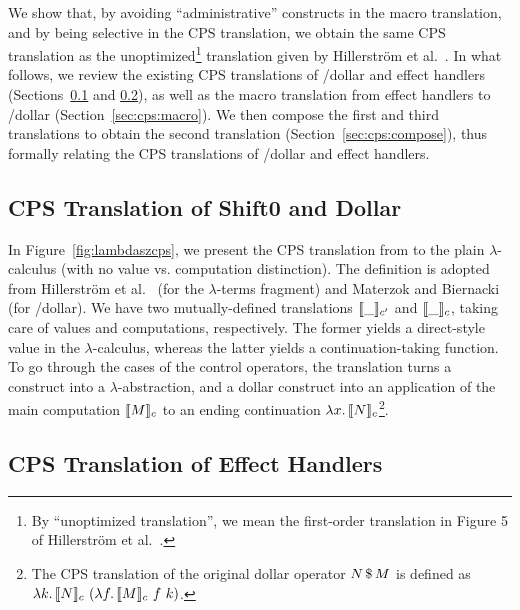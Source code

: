\noindent We show that, by avoiding ``administrative'' constructs in the 
macro translation, and by being selective in the CPS translation, we obtain 
the same CPS translation as the unoptimized\footnote{By ``unoptimized 
translation'', we mean the first-order translation in Figure 5 of 
Hillerstr\"om et al.~\cite{hillerstrom-cps}.}
translation given by Hillerstr\"om et al.~\cite{hillerstrom-cps}.
In what follows, we review the existing CPS translations of \shiftztt/dollar
and effect handlers (Sections~\ref{sec:cps:shiftz} and \ref{sec:cps:handler}),
as well as the macro translation from effect handlers to \shiftztt/dollar
(Section~\ref{sec:cps:macro}).
We then compose the first and third translations to obtain the second
translation (Section~\ref{sec:cps:compose}), thus formally relating the CPS
translations of \shiftztt/dollar and effect handlers.


\subsection{CPS Translation of Shift0 and Dollar}
\label{sec:cps:shiftz}

In Figure~\ref{fig:lambdaszcps}, we present the CPS translation from
\lambdasz to the plain $\lambda$-calculus (with no value vs. computation 
distinction).
The definition is adopted from Hillerstr\"om et al.~\cite{hillerstrom-cps}
(for the $\lambda$-terms fragment) and Materzok and
Biernacki~\cite{materzok-hierarchy} (for \shiftztt/dollar).
We have two mutually-defined translations $\llbracket \_ \rrbracket_{c^\prime}$ and $\llbracket \_ \rrbracket_c$,
taking care of values and computations, respectively.
The former yields a direct-style value in the $\lambda$-calculus, whereas
the latter yields a continuation-taking function.
To go through the cases of the control operators, the translation turns a
\shiftztt construct into a $\lambda$-abstraction, and a dollar construct
into an application of the main computation $\llbracket M \rrbracket_c$ to an ending
continuation $\lambda x.\, \llbracket N \rrbracket_c$\footnote{The CPS translation of the original
dollar operator $N \, \$ \, M$ is defined as
$\lambda k.\, \llbracket N \rrbracket_c \ (\lambda f.\, \llbracket M \rrbracket_c \ f \ k)$.}.

\LambdaszCPS


\subsection{CPS Translation of Effect Handlers}
\label{sec:cps:handler}

\LambdahCPS

